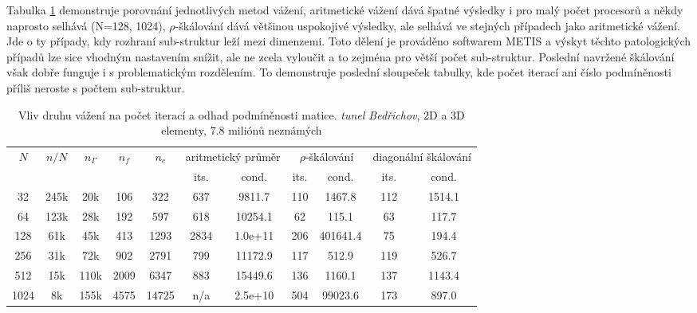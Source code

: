\documentclass[11pt]{report}
\begin{document}
Tabulka \ref{tab:tunnel_averaging} demonstruje porovnání 
jednotlivých metod vážení, aritmetické vážení dává špatné výsledky i pro malý 
počet procesorů a někdy naprosto selhává (N=128, 1024), $\rho$-škálování dává 
většinou uspokojivé výsledky, ale selhává ve stejných případech jako aritmetické 
vážení. Jde o ty případy, kdy rozhraní sub-struktur leží 
mezi dimenzemi. Toto dělení je prováděno softwarem METIS a výskyt těchto 
patologických případů lze sice vhodným nastavením snížit, ale ne zcela vyloučit 
a to zejména pro větší počet sub-struktur. Poslední navržené škálování  však 
dobře funguje i s problematickým rozdělením. To demonstruje poslední sloupeček 
tabulky, kde
počet iterací ani číslo podmíněnosti příliš neroste s počtem sub-struktur.

\begin{table}[t]
\begin{center}
\begin{tabular}
[c]{|cc|ccc|cc|cc|cc|}\hline
\multirow{2}{*}{$N$} & \multirow{2}{*}{$n/N$} &
\multirow{2}{*}{$n_{\Gamma}$} & \multirow{2}{*}{$n_f$} &
\multirow{2}{*}{$n_c$} & \multicolumn{2}{c|}{aritmetický průměr} 
&
\multicolumn{2}{c|}{$\rho$-škálování} & \multicolumn{2}{c|}{diagonální 
škálování}\\
&  &  &  &  & its. & cond. & its. & cond. & its. & cond.\\\hline
32 & 245k & 20k & 106 & 322 & 637 & 9811.7 & 110 & 1467.8 & 112 & 1514.1\\
64 & 123k & 28k & 192 & 597 & 618 & 10254.1 & 62 & 115.1 & 63 & 117.7\\
128 & 61k & 45k & 413 & 1293 & 2834 & 1.0e+11 & 206 & 401641.4 & 75 & 194.4\\
256 & 31k & 72k & 902 & 2791 & 799 & 11172.9 & 117 & 512.9 & 119 & 526.7\\
512 & 15k & 110k & 2009 & 6347 & 883 & 15449.6 & 136 & 1160.1 & 137 & 1143.4\\
1024 & 8k & 155k & 4575 & 14725 & n/a & 2.5e+10 & 504 & 99023.6 & 173 &
897.0\\\hline
\end{tabular}
\end{center}
\caption{\label{tab:tunnel_averaging}
Vliv druhu vážení na počet iterací a odhad podmíněnosti matice.
\emph{tunel Bedřichov}, 2D a 3D elementy, 7.8 miliónů neznámých}
\end{table}
\end{document}
